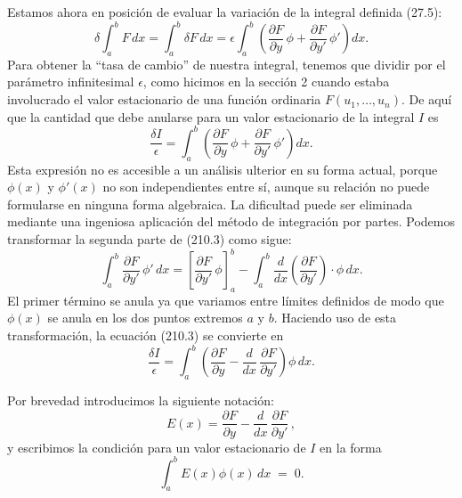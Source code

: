 \documentclass[12pt,a4paper]{book}
\begin{document}
Estamos ahora en posición de evaluar la variación de la integral definida (27.5):
\begin{equation}
\delta \int_a^b F \, dx = \int_a^b \delta F \, dx = \epsilon \int_a^b \left( \frac{\partial F}{\partial y} \, \phi + \frac{\partial F}{\partial y'} \, \phi' \right) dx. \tag{210.2}
\end{equation}
Para obtener la ``tasa de cambio'' de nuestra integral, tenemos que dividir por el parámetro infinitesimal $\epsilon$, como hicimos en la sección 2 cuando estaba involucrado el valor estacionario de una función ordinaria $F(u_1, \ldots, u_n)$. De aquí que la cantidad que debe anularse para un valor estacionario de la integral $I$ es
\begin{equation}
\frac{\delta I}{\epsilon} = \int_a^b \left( \frac{\partial F}{\partial y} \, \phi + \frac{\partial F}{\partial y'} \, \phi' \right) dx. \tag{210.3}
\end{equation}
Esta expresión no es accesible a un análisis ulterior en su forma actual, porque $\phi(x)$ y $\phi'(x)$ no son independientes entre sí, aunque su relación no puede formularse en ninguna forma algebraica. La dificultad puede ser eliminada mediante una ingeniosa aplicación del método de integración por partes. Podemos transformar la segunda parte de (210.3) como sigue:
\begin{equation}
\int_a^b \frac{\partial F}{\partial y'} \, \phi' \, dx = \left[ \frac{\partial F}{\partial y'} \, \phi \right]_a^b - \int_a^b \frac{d}{dx} \left( \frac{\partial F}{\partial y'} \right) \cdot \phi \, dx. \tag{210.4}
\end{equation}
El primer término se anula ya que variamos entre límites definidos de modo que $\phi(x)$ se anula en los dos puntos extremos $a$ y $b$. Haciendo uso de esta transformación, la ecuación (210.3) se convierte en
\begin{equation}
\frac{\delta I}{\epsilon} = \int_a^b \left( \frac{\partial F}{\partial y} - \frac{d}{dx} \, \frac{\partial F}{\partial y'} \right) \phi \, dx. \tag{210.5}
\end{equation}

Por brevedad introducimos la siguiente notación:
\begin{equation}
E(x) = \frac{\partial F}{\partial y} - \frac{d}{dx} \, \frac{\partial F}{\partial y'} \, , \tag{210.6}
\end{equation}
y escribimos la condición para un valor estacionario de $I$ en la forma
\begin{equation}
\int_a^b E(x)\phi(x) \, dx \;=\; 0. \tag{210.7}
\end{equation}
\end{document}
